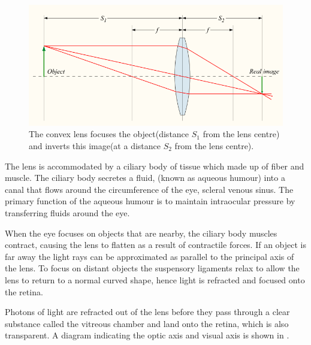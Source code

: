 \begin{figure}[htbp]
 \centering
   \includegraphics{figures/convergent_lens2}
 \caption{The convex lens focuses the object(distance $S_1$ from the lens centre) and inverts this image(at a distance $S_2$ from the lens centre). \cite{greivenkamp2004field}}
 \label{fig:convergent_lens}
\end{figure}

The lens is accommodated by a ciliary body of tissue which made up of fiber and muscle.
The ciliary body secretes a fluid, (known as aqueous humour) into a canal that flows
around the circumference of the eye, scleral venous sinus.
\cite{bill1970effects,dvorak1934schlemm} The primary function of the aqueous humour
is to maintain intraocular pressure by transferring fluids around the eye.


When the eye focuses on objects that are nearby, the ciliary body muscles contract,
causing the lens to flatten as a result of contractile forces. If an object is far
away the light rays can be approximated as parallel to the principal axis of the lens.
To focus on distant objects the suspensory ligaments relax to allow the lens to return
to a normal curved shape, hence light is refracted and focused onto the retina.

Photons of light are refracted out of the lens before they pass through
a clear substance called the vitreous chamber and land onto the retina,
which is also transparent. A diagram indicating the optic axis and
visual axis is shown in .

